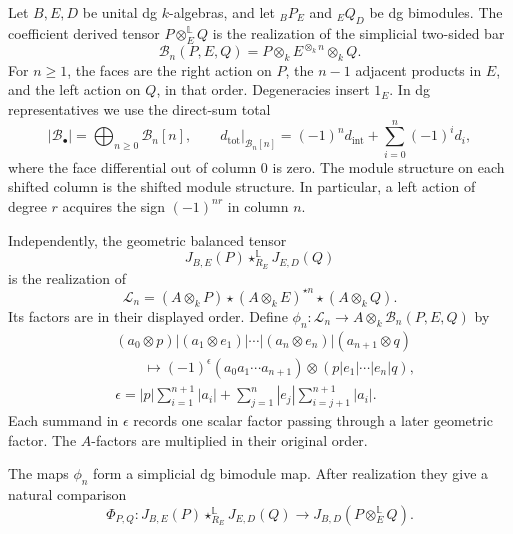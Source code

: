 Let \(B,E,D\) be unital dg \(k\)-algebras, and let
\({}_BP_E\) and \({}_EQ_D\) be dg bimodules. The coefficient
derived tensor \(P\otimes_E^{\mathbb L}Q\) is the realization of
the simplicial two-sided bar
\begin{equation}\label{v4-eq:coefficient-bar}
 \mathcal B_n(P,E,Q)=P\otimes_kE^{\otimes_kn}\otimes_kQ.
\end{equation}
For \(n\geq1\), the faces are the right action on \(P\), the
\(n-1\) adjacent products in \(E\), and the left action on
\(Q\), in that order. Degeneracies insert \(1_E\).
In dg representatives we use the direct-sum total
\begin{equation}\label{v4-eq:bar-total}
 |\mathcal B_\bullet|
   =\bigoplus_{n\geq0}\mathcal B_n[n],
 \qquad
 d_{\mathrm{tot}}\big|_{\mathcal B_n[n]}
   =(-1)^nd_{\mathrm{int}}+\sum_{i=0}^{n}(-1)^id_i,
\end{equation}
where the face differential out of column \(0\) is zero.
The module structure on each shifted column is the shifted
module structure. In particular, a left action of degree
\(r\) acquires the sign \((-1)^{nr}\) in column \(n\).

Independently, the geometric balanced tensor
\[
 J_{B,E}(P)\star_{R_E}^{\mathbb L}J_{E,D}(Q)
\]
is the realization of
\begin{equation}\label{v4-eq:geometric-interface-bar}
 \mathcal L_n
   =(A\otimes_kP)\star
      (A\otimes_kE)^{\star n}\star(A\otimes_kQ).
\end{equation}
Its factors are in their displayed order. Define
\(\phi_n:\mathcal L_n\to A\otimes_k\mathcal B_n(P,E,Q)\) by
\begin{equation}\label{v4-eq:relative-bar-map}
\begin{split}
 &(a_0\otimes p)|(a_1\otimes e_1)|\cdots|
       (a_n\otimes e_n)|(a_{n+1}\otimes q)\\
 &\qquad\longmapsto
 (-1)^{\epsilon}(a_0a_1\cdots a_{n+1})
       \otimes(p|e_1|\cdots|e_n|q),\\
 &\epsilon
   =|p|\sum_{i=1}^{n+1}|a_i|
      +\sum_{j=1}^{n}|e_j|
          \sum_{i=j+1}^{n+1}|a_i|.
\end{split}
\end{equation}
Each summand in \(\epsilon\) records one scalar factor passing
through a later geometric factor. The \(A\)-factors are
multiplied in their original order.

\begin{lemma}\label{v4-lem:relative-bar-map}
The maps \(\phi_n\) form a simplicial dg bimodule map.
After realization they give a natural comparison
\[
 \Phi_{P,Q}:
 J_{B,E}(P)\star_{R_E}^{\mathbb L}J_{E,D}(Q)
 \longrightarrow
 J_{B,D}(P\otimes_E^{\mathbb L}Q).
\]
\end{lemma}

